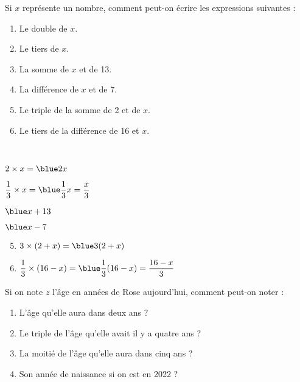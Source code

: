 \begin{colonne*exercice}

\begin{exercice} %
   Si $x$ représente un nombre, comment peut-on écrire les expressions suivantes :
   \begin{enumerate}
      \item Le double de $x$.
      \item Le tiers de $x$.
      \item La somme de $x$ et de 13.
      \item La différence de $x$ et de 7.
      \item Le triple de la somme de 2 et de $x$.
      \item Le tiers de la différence de 16 et $x$.
   \end{enumerate}
\end{exercice}

\begin{corrige}
   \ \\ [-5mm]
   \begin{colenumerate}{2}
      \item $2\times x =\blue2x$ \smallskip
      \item $\dfrac13\times x =\blue\dfrac13x =\dfrac{x}{3}$ \smallskip
      \item $\blue x+13$
      \item $\blue x-7$
   \end{colenumerate}
   \begin{enumerate}
      \setcounter{enumi}{4}
      \item $3\times(2+x) =\blue3(2+x)$ \smallskip
      \item $\dfrac13\times(16-x) =\blue\dfrac13(16-x) =\dfrac{16-x}{3}$
   \end{enumerate}
\end{corrige}

\bigskip


\begin{exercice} %
   Si on note $z$ l'âge en années de Rose aujourd'hui, comment peut-on noter :
   \begin{enumerate}
      \item L'âge qu'elle aura dans deux ans ?
      \item Le triple de l'âge qu'elle avait il y a quatre ans ?
      \item La moitié de l'âge qu'elle aura dans cinq ans ?
      \item Son année de naissance si on est en 2022 ?
   \end{enumerate}
\end{exercice}


\end{colonne*exercice}

